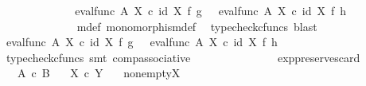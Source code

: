 \begin{isabellebody}
\ \ \ \ \ \ \ \ \ \ \isamarkupfalse%
\ \isamarkupfalse%
\ {\isachardoublequoteopen}eval{\isacharunderscore}{\kern0pt}func\ A\ X\ {\isasymcirc}\isactrlsub c\ {\isacharparenleft}{\kern0pt}id\ X\ {\isasymtimes}\isactrlsub f\ g{\isacharparenright}{\kern0pt}\ \ {\isacharequal}{\kern0pt}\ eval{\isacharunderscore}{\kern0pt}func\ A\ X\ {\isasymcirc}\isactrlsub c\ {\isacharparenleft}{\kern0pt}id\ X\ {\isasymtimes}\isactrlsub f\ h{\isacharparenright}{\kern0pt}{\isachardoublequoteclose}\isanewline
\ \ \ \ \ \ \ \ \ \ \ \ \isamarkupfalse%
\ m{\isacharunderscore}{\kern0pt}def\ monomorphism{\isacharunderscore}{\kern0pt}def{}\ \isamarkupfalse%
\ {\isacharparenleft}{\kern0pt}typecheck{\isacharunderscore}{\kern0pt}cfuncs{\isacharcomma}{\kern0pt}\ blast{\isacharparenright}{\kern0pt}\isanewline
\ \ \ \ \ \ \ \ \ \ \isamarkupfalse%
\ \isamarkupfalse%
\ {\isachardoublequoteopen}{\isacharparenleft}{\kern0pt}eval{\isacharunderscore}{\kern0pt}func\ A\ X\ {\isasymcirc}\isactrlsub c\ {\isacharparenleft}{\kern0pt}id\ X\ {\isasymtimes}\isactrlsub f\ g{\isacharparenright}{\kern0pt}{\isacharparenright}{\kern0pt}\ \ {\isacharequal}{\kern0pt}\ {\isacharparenleft}{\kern0pt}eval{\isacharunderscore}{\kern0pt}func\ A\ X\ {\isasymcirc}\isactrlsub c\ {\isacharparenleft}{\kern0pt}id\ X\ {\isasymtimes}\isactrlsub f\ h{\isacharparenright}{\kern0pt}{\isacharparenright}{\kern0pt}{\isachardoublequoteclose}\isanewline
\ \ \ \ \ \ \ \ \ \ \ \ \isamarkupfalse%
\ {\isacharparenleft}{\kern0pt}typecheck{\isacharunderscore}{\kern0pt}cfuncs{\isacharcomma}{\kern0pt}\ smt\ comp{\isacharunderscore}{\kern0pt}associative{}{\isacharparenright}{\kern0pt}\isanewline
\ \ \ \ \ \ \isamarkupfalse%
\isanewline
\ \ \ \ \isamarkupfalse%
\isanewline
\ \ \isamarkupfalse%
\isanewline
{}\isamarkupfalse%
%
\endisatagproof
{\isafoldproof}%
%
\isadelimproof
\isanewline
%
\endisadelimproof
\isanewline
{}\isamarkupfalse%
\ exp{\isacharunderscore}{\kern0pt}preserves{\isacharunderscore}{\kern0pt}card{}{\isacharcolon}{\kern0pt}\isanewline
\ \ \ {\isachardoublequoteopen}A\ {\isasymle}\isactrlsub c\ B{\isachardoublequoteclose}\isanewline
\ \ \ {\isachardoublequoteopen}X\ {\isasymle}\isactrlsub c\ Y{\isachardoublequoteclose}\isanewline
\ \ \ {\isachardoublequoteopen}nonempty{\isacharparenleft}{\kern0pt}X{\isacharparenright}{\kern0pt}{\isachardoublequoteclose}\isanewline

\end{isabellebody}
